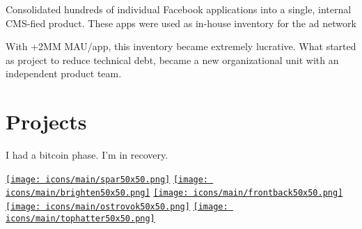 \documentclass[]{plushcv}
\begin{document}
\begin{minipage}[t]{0.70\textwidth}
\begin{tightemize}
\item Consolidated hundreds of individual Facebook applications into a single, internal CMS-fied  product. These apps were used as in-house inventory for the ad network  
\item With +2MM MAU/app, this inventory became extremely lucrative.  What started as project to reduce technical debt, became a new organizational unit with an independent product team.
\end{tightemize}
\sectionsep





\section{Projects}

\begin{tightemize}
\item I had a bitcoin phase. I'm in recovery. 
\end{tightemize}
\sectionsep

\sectionsep
\sectionsep
\sectionsep
\sectionsep
\href{https://getspar.com}{\texttt{[image: icons/main/spar50x50.png]}}\hspace{0.3cm}
\href{https://www.nytimes.com/2016/12/20/fashion/austin-kevitch-brighten-app-anti-bullying.html}{\texttt{[image: icons/main/brighten50x50.png]}}\hspace{0.3cm}
\href{https://www.businessinsider.com/frontback-the-once-hot-startup-that-rejected-a-40-million-twitter-acquisition-is-back-from-the-dead-2015-7}{\texttt{[image: icons/main/frontback50x50.png]}}\hspace{0.3cm}
\href{https://apps.apple.com/us/app/ostrovok-ru-hotel-deals/id564204730}{\texttt{[image: icons/main/ostrovok50x50.png]}}\hspace{0.3cm}
\href{https://tophatter.com}{\texttt{[image: icons/main/tophatter50x50.png]}}



\end{minipage} 
\hfill
\end{document}
